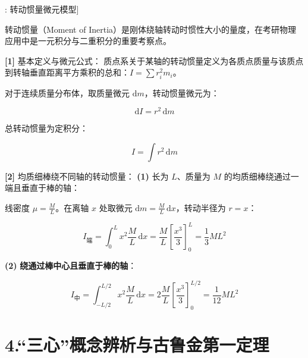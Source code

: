 \documentclass[11pt,a4paper,UTF8]{ctexart}
\begin{document}
\begin{thmbox}[模型[5]: 转动惯量微元模型]

转动惯量（Moment of Inertia）是刚体绕轴转动时惯性大小的量度，在考研物理应用中是一元积分与二重积分的重要考察点。

\textbf{[1]} 基本定义与微元公式：
质点系关于某轴的转动惯量定义为各质点质量与该质点到转轴垂直距离平方乘积的总和：$I = \sum r_i^2 m_i$。

对于连续质量分布体，取质量微元 $\mathrm{d}m$，转动惯量微元为：


\begin{equation*}
\mathrm{d}I = r^2\,\mathrm{d}m
\end{equation*}


总转动惯量为定积分：


\begin{equation*}
I = \int r^2\,\mathrm{d}m
\end{equation*}


\textbf{[2]} 均质细棒绕不同轴的转动惯量：
\textbf{(1)}  \textit{}长为 $L$、质量为 $M$ 的均质细棒绕通过一端且垂直于棒的轴\textit{}：

线密度 $\mu = \frac{M}{L}$。在离轴 $x$ 处取微元 $\mathrm{d}m = \frac{M}{L}\,\mathrm{d}x$，转动半径为 $r = x$：


\begin{equation*}
I_{\text{端}} = \int_0^L x^2 \frac{M}{L}\,\mathrm{d}x = \frac{M}{L} \left[\frac{x^3}{3}\right]_0^L = \frac{1}{3} M L^2
\end{equation*}


\textbf{(2)}  \textbf{绕通过棒中心且垂直于棒的轴}：


\begin{equation*}
I_{\text{中}} = \int_{-L/2}^{L/2} x^2 \frac{M}{L}\,\mathrm{d}x = 2 \frac{M}{L} \left[\frac{x^3}{3}\right]_0^{L/2} = \frac{1}{12} M L^2
\end{equation*}


\end{thmbox}

\section{4.“三心”概念辨析与古鲁金第一定理}
\end{document}
